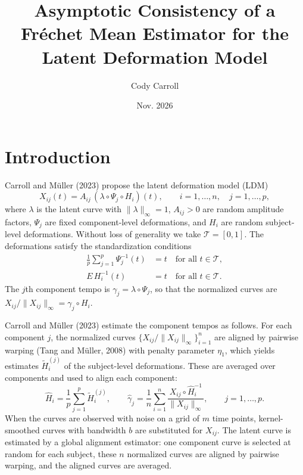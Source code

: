 \documentclass[11pt]{article}
\title{Asymptotic Consistency of a Fr\'echet Mean Estimator for the Latent Deformation Model}
\author{Cody Carroll}
\date{Nov. 2026}
\newcommand{\T}{\mathcal{T}}
\newcommand{\ghat}{\hat{\gamma}}
\newcommand{\norm}[1]{\|#1\|_\infty}
\begin{document}
\maketitle
\onehalfspacing

\section{Introduction}

Carroll and M\"{u}ller (2023) propose the latent deformation model (LDM)
\begin{equation}
  X_{ij}(t) = A_{ij}\,(\lambda \circ \Psi_j \circ H_i)(t),
  \qquad i = 1,\ldots,n,\quad j = 1,\ldots,p,
  \label{eq:LDM}
\end{equation}
where $\lambda$ is the latent curve with $\norm{\lambda} = 1$, $A_{ij} > 0$ are random
amplitude factors, $\Psi_j$ are fixed component-level deformations, and $H_i$ are random
subject-level deformations. Without loss of generality we take $\T = [0,1]$. The
deformations satisfy the standardization conditions
\begin{align}
  \frac{1}{p}\sum_{j=1}^p \Psi_j^{-1}(t) &= t \quad \text{for all } t \in \T,
  \label{eq:std-psi}\\
  E\, H_i^{-1}(t) &= t \quad \text{for all } t \in \T.
  \label{eq:std-H}
\end{align}
The $j$th component tempo is $\gamma_j = \lambda \circ \Psi_j$, so that the normalized curves are
$X_{ij}/\norm{X_{ij}} = \gamma_j \circ H_i$.

Carroll and M\"{u}ller (2023) estimate the component tempos as follows. For each component
$j$, the normalized curves $\{X_{ij}/\norm{X_{ij}}\}_{i=1}^n$ are aligned by pairwise warping
(Tang and M\"{u}ller, 2008) with penalty parameter $\eta_1$, which yields estimates
$\tilde{H}_i^{(j)}$ of the subject-level deformations. These are averaged over components and
used to align each component:
\begin{equation}
  \hat{H}_i = \frac{1}{p}\sum_{j=1}^p \tilde{H}_i^{(j)},
  \qquad
  \ghat_j = \frac{1}{n}\sum_{i=1}^n \frac{X_{ij}\circ\hat{H}_i^{-1}}{\norm{X_{ij}}},
  \qquad j = 1,\ldots,p.
  \label{eq:gammahat}
\end{equation}
When the curves are observed with noise on a grid of $m$ time points, kernel-smoothed curves
with bandwidth $b$ are substituted for $X_{ij}$. The latent curve is estimated by a global
alignment estimator: one component curve is selected at random for each subject, these $n$
normalized curves are aligned by pairwise warping, and the aligned curves are averaged.
\end{document}
